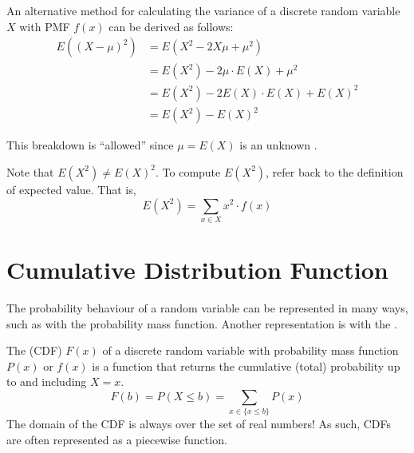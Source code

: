 An alternative method for calculating the variance of a discrete random variable $X$ with PMF $f(x)$ can be derived as follows:
\begin{align*}
    E((X - \mu)^2) & = E(X^2 - 2X\mu + \mu^2)             \\
                   & = E(X^2) - 2\mu \cdot E(X) + \mu^2   \\
                   & = E(X^2) - 2E(X) \cdot E(X) + E(X)^2 \\
                   & = E(X^2) - E(X)^2
\end{align*}

This breakdown is ``allowed'' since $\mu = E(X)$ is an unknown . 

Note that $E(X^2) \neq E(X)^2$. To compute $E(X^2)$, refer back to the definition of expected value. That is, $$E(X^2) = \sum_{x \in X} x^2 \cdot f(x)$$

\section{Cumulative Distribution Function}

The probability behaviour of a random variable can be represented in many ways, such as with the probability mass function. Another representation is with the .

\begin{definition}
    The  (CDF) $F(x)$ of a discrete random variable with probability mass function $P(x)$ or $f(x)$ is a function that returns the cumulative (total) probability up to and including $X = x$. $$F(b) = P(X \le b) = \sum_{x \in \{ x \le b \}} P(x)$$ The domain of the CDF is always over the set of real numbers! As such, CDFs are often represented as a piecewise function.
\end{definition}

